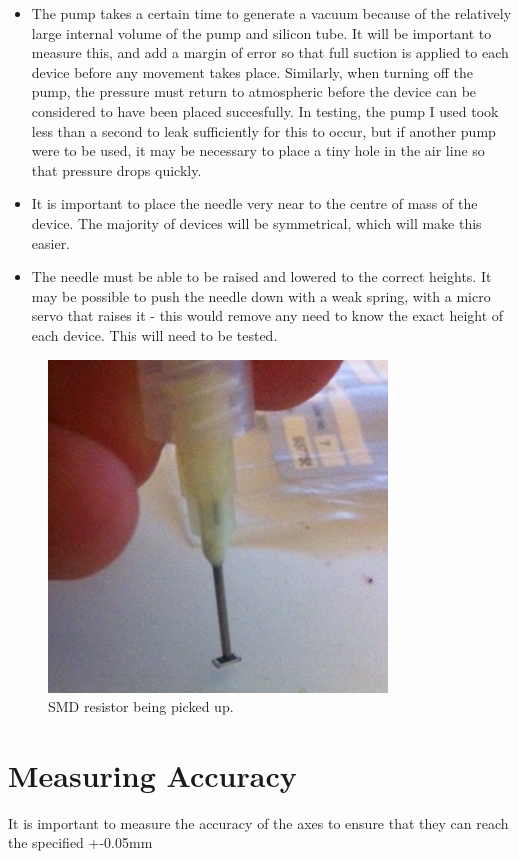 \documentclass[a4paper,11pt]{article}  %
\begin{document}
\begin{itemize}
	\item	The pump takes a certain time to generate a vacuum because of the relatively large internal volume of the pump
		and silicon tube. It will be important to measure this, and add a margin of error so that full suction is applied
		to each device before any movement takes place. Similarly, when turning off the pump, the pressure must return to
		atmospheric before the device can be considered to have been placed succesfully. In testing, the pump I used took
		less than a second to leak sufficiently for this to occur, but if another pump were to be used, it may be necessary
		to place a tiny hole in the air line so that pressure drops quickly.
	\item	It is important to place the needle very near to the centre of mass of the device. The majority of devices will be
		symmetrical, which will make this easier.
	\item	The needle must be able to be raised and lowered to the correct heights. It may be possible to push the needle down
		with a weak spring, with a micro servo that raises it - this would remove any need to know the exact height of each
		device. This will need to be tested.
\end{itemize}

\begin{figure}[ht!]
\centering
\includegraphics[width=90mm]{resources/needle_with_resistor.jpg}
\caption{SMD resistor being picked up.}
\label{overflow}
\end{figure}

\section{Measuring Accuracy}
It is important to measure the accuracy of the axes to ensure that they can reach the specified +-0.05mm
\end{document}
